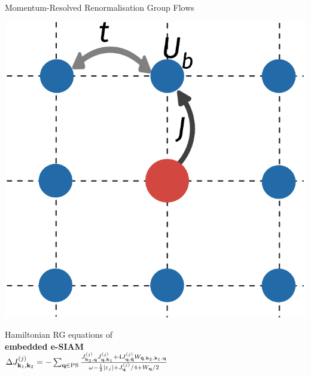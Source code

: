 \documentclass[12pt,aspectratio=169]{beamer}
\newcommand\focus[1]{%
	{\alert{\textbf{#1}}}
}
\begin{document}
\begin{frame}{Momentum-Resolved Renormalisation Group Flows}
\begin{minipage}{0.25\textwidth}
	\includegraphics[width=\textwidth]{pWaveEsiam.pdf}
\end{minipage}
\hspace*{\fill}
\begin{minipage}{0.45\textwidth}
	Hamiltonian RG equations of \\
	\focus{embedded e-SIAM}\\
	\(\Delta J^{(j)}_{{\bf k}_1, {\bf k}_2} = -\sum_{{\bf q} \in \text{PS}} \frac{J^{(j)}_{{\bf k}_2,{\bf q}} J^{(j)}_{{\bf q},{\bf k}_1} + 4J^{(j)}_{{\bf q}, {\bf \bar q}} W_{{\bf \bar q}, {\bf k}_2, {\bf k}_1, {\bf q}}}{\omega - \frac{1}{2}|\varepsilon_j| + J^{(j)}_{{\bf q}}/4 + W_{{\bf q}}/2}\)
\end{minipage}
\hspace*{\fill}
\begin{minipage}{0.25\textwidth}

\end{minipage}
\end{frame}
\end{document}
